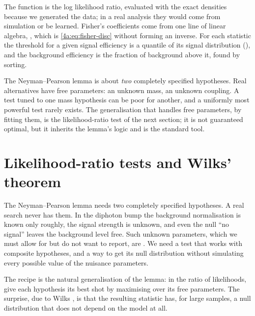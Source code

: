 
The function  is the log likelihood ratio, evaluated with the
exact densities because we generated the data; in a real analysis they would
come from simulation or be learned. Fisher's coefficients come from one line of
linear algebra, , which is
\eqref{4a:eq:fisher-disc} without forming an inverse. For each statistic the
threshold for a given signal efficiency is a quantile of its signal
distribution (), and the background efficiency is the
fraction of background above it, found by sorting.

\begin{pitfall}
The Neyman--Pearson lemma is about \emph{two} completely specified
hypotheses. Real alternatives have free parameters: an unknown mass, an
unknown coupling. A test tuned to one mass hypothesis can be poor for another,
and a uniformly most powerful test rarely exists. The generalisation that
handles free parameters, by fitting them, is the likelihood-ratio test of the
next section; it is not guaranteed optimal, but it inherits the lemma's logic
and is the standard tool.
\end{pitfall}
\section{Likelihood-ratio tests and Wilks' theorem}
\label{4a:sec:wilks}

The Neyman--Pearson lemma needs two completely specified hypotheses. A real
search never has them. In the diphoton bump the background normalisation is
known only roughly, the signal strength is unknown, and even the null ``no
signal'' leaves the background level free. Such unknown parameters, which we
must allow for but do not want to report, are 
. We need a test that works with composite
hypotheses, and a way to get its null distribution without simulating every
possible value of the nuisance parameters.

The recipe is the natural generalisation of the lemma: in the ratio of
likelihoods, give each hypothesis its best shot by maximising over its free
parameters. The surprise, due to Wilks \cite{Wilks1938}, is that the resulting
statistic has, for large samples, a null distribution that does not depend on
the model at all.

